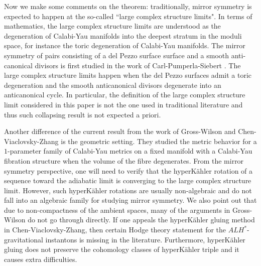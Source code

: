 \documentclass[11pt]{amsart}
\theoremstyle{plain}
\newtheorem{thm}{Theorem}[section]
\theoremstyle{definition}
\numberwithin{equation}{section}
\renewcommand{\leq}{\leqslant}
\begin{document}
Now we make some comments on the theorem: traditionally, mirror symmetry is expected to  happen at the so-called ``large complex structure limits". In terms of mathematics, the large complex structure limits are understood as the degeneration of Calabi-Yau manifolds into the deepest stratum in the moduli space, for instance the toric degeneration of Calabi-Yau manifolds. The mirror symmetry of pairs consisting of a del Pezzo surface surface and a smooth anti-canonical divisors is first studied in the work of Carl-Pumperla-Siebert \cite{CPS}. The large complex structure limits happen when the 
del Pezzo surfaces admit a toric degeneration and the smooth anticanonical divisors degenerate into an anticanonical cycle. In particular, the definition of the large complex structure limit considered in this paper is not the one used in traditional literature and thus such collapsing result is not expected a priori. 

Another difference of the current result from the work of Gross-Wilson \cite{GW} and Chen-Viaclovsky-Zhang \cite{CVZ} is the geometric setting. They studied the metric behavior for a $1$-parameter family of Calabi-Yau metrics on a fixed manifold with a Calabi-Yau fibration structure when the volume of the fibre degenerates. From the mirror symmetry perspective, one will need to verify that the hyperK\"ahler rotation of a sequence toward the adiabatic limit is converging to the large complex structure limit. However, such hyperK\"ahler rotations are usually non-algebraic and do not fall into an algebraic family for studying mirror symmetry. 
We also point out that due to non-compactness of the ambient spaces, many of the arguments in Gross-Wilson do not go through directly. If one appeals the hyperK\"ahler gluing method in Chen-Viaclovsky-Zhang, then certain Hodge theory statement for the $ALH^*$-gravitational instantons is missing in the literature. Furthermore, hyperK\"ahler gluing does not preserve the cohomology classes of hyperK\"ahler triple and it causes extra difficulties. 


\end{document}
